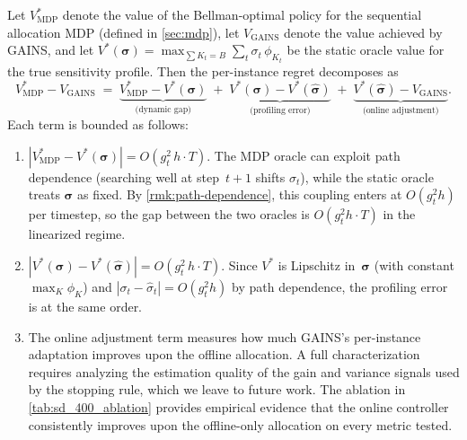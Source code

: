 \begin{proposition}
\label{prop:regret-decomp}
Let $V_{\mathrm{MDP}}^*$ denote the value of the Bellman-optimal
policy for the sequential allocation MDP (defined in
\cref{sec:mdp}), let $V_{\mathrm{GAINS}}$ denote the value
achieved by GAINS, and let
$V^*(\boldsymbol{\sigma})=\max_{\sum K_t=B}\sum_t\sigma_t\,\phi_{K_t}$
be the static oracle value for the true sensitivity profile.
Then the per-instance regret decomposes as
\begin{equation}
  V_{\mathrm{MDP}}^*
  - V_{\mathrm{GAINS}}
  \;=\;
  \underbrace{V_{\mathrm{MDP}}^*
  - V^*(\boldsymbol{\sigma})}_{\text{(dynamic gap)}}
  \;+\;
  \underbrace{V^*(\boldsymbol{\sigma})
  - V^*(\hat{\boldsymbol{\sigma}})}_{\text{(profiling error)}}
  \;+\;
  \underbrace{V^*(\hat{\boldsymbol{\sigma}})
  - V_{\mathrm{GAINS}}}_{\text{(online adjustment)}}.
  \label{eq:regret-decomp}
\end{equation}
Each term is bounded as follows:
\begin{enumerate}
\item[\textbf{(i)}]
  $|V_{\mathrm{MDP}}^* - V^*(\boldsymbol{\sigma})|
  = O(g_t^2\,h\cdot T)$.
  The MDP oracle can exploit path dependence
  (searching well at step~$t{+}1$ shifts $\sigma_t$),
  while the static oracle treats $\boldsymbol{\sigma}$ as fixed.
  By \cref{rmk:path-dependence}, this coupling enters at
  $O(g_t^2 h)$ per timestep, so the gap between the two
  oracles is $O(g_t^2 h\cdot T)$ in the linearized regime.
\item[\textbf{(ii)}]
  $|V^*(\boldsymbol{\sigma})-V^*(\hat{\boldsymbol{\sigma}})|
  = O(g_t^2\,h\cdot T)$.
  Since $V^*$ is Lipschitz in~$\boldsymbol{\sigma}$
  (with constant $\max_K\phi_K$) and
  $|\sigma_t-\hat\sigma_t|=O(g_t^2 h)$ by path dependence,
  the profiling error is at the same order.
\item[\textbf{(iii)}]
  The online adjustment term measures how much GAINS's
  per-instance adaptation improves upon the offline allocation.
  A full characterization requires analyzing the estimation
  quality of the gain and variance signals used by the
  stopping rule, which we leave to future work.
  The ablation in \cref{tab:sd_400_ablation} provides empirical
  evidence that the online controller consistently improves
  upon the offline-only allocation on every metric tested.
\end{enumerate}
\end{proposition}

